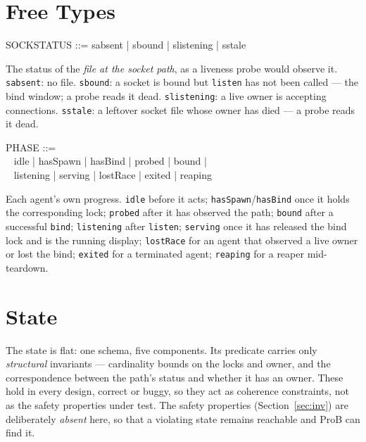 \documentclass[a4paper,10pt,fleqn]{article}
\begin{document}
\section{Free Types}

\begin{zed}
  SOCKSTATUS ::= sabsent | sbound | slistening | sstale
\end{zed}

The status of the \emph{file at the socket path}, as a liveness probe
would observe it.  \texttt{sabsent}: no file.  \texttt{sbound}: a socket
is bound but \texttt{listen} has not been called --- the bind window; a
probe reads it dead.  \texttt{slistening}: a live owner is accepting
connections.  \texttt{sstale}: a leftover socket file whose owner has
died --- a probe reads it dead.

\begin{zed}
  PHASE ::= \\
  \quad~ idle | hasSpawn | hasBind | probed | bound | \\
  \quad~ listening | serving | lostRace | exited | reaping
\end{zed}

Each agent's own progress.  \texttt{idle} before it acts;
\texttt{hasSpawn}/\texttt{hasBind} once it holds the corresponding lock;
\texttt{probed} after it has observed the path; \texttt{bound} after a
successful \texttt{bind}; \texttt{listening} after \texttt{listen};
\texttt{serving} once it has released the bind lock and is the running
display; \texttt{lostRace} for an agent that observed a live owner or
lost the bind; \texttt{exited} for a terminated agent; \texttt{reaping}
for a reaper mid-teardown.

\section{State}

The state is flat: one schema, five components.  Its predicate carries
only \emph{structural} invariants --- cardinality bounds on the locks and
owner, and the correspondence between the path's status and whether it
has an owner.  These hold in every design, correct or buggy, so they act
as coherence constraints, not as the safety properties under test.  The
safety properties (Section~\ref{sec:inv}) are deliberately \emph{absent}
here, so that a violating state remains reachable and ProB can find it.
\end{document}

